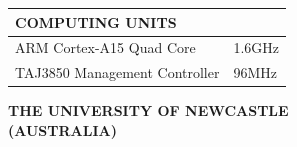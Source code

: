 \documentclass[10pt,a4paper]{article}
\begin{document}
\begin{multicols}{2}
\begin{table}[H]
	\begin{tabular}{|m{5.75cm}|m{1.15cm}|}
		\hline
		\rowcolor[rgb]{0.0, 0.0, 0.0}
		{\color{textcolour}\textbf{{COMPUTING UNITS}}} & \\
		\hline
		ARM Cortex-A15 Quad Core & 1.6GHz \\
		\hline
		TAJ3850 Management Controller & 96MHz \\
		\hline
	\end{tabular}
\end{table}

\columnbreak

\begin{center}
	\colorbox[rgb]{0.0, 0.0, 0.0}
	{
	\begin{minipage}[c][3.5em][c]{0.45\textwidth}
		\begin{center}
			{\color{textcolour}
				{
				\textbf{THE UNIVERSITY OF NEWCASTLE \\
				(AUSTRALIA)}
				}
			}
		\end{center}
	\end{minipage}
	}
\end{center}


\end{multicols}
\end{document}
